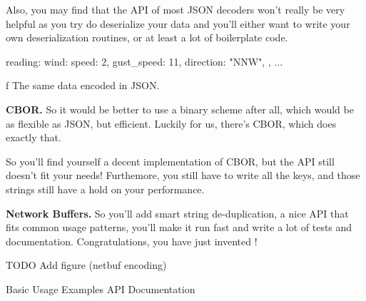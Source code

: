 Also, you may find that the API of most JSON decoders won't really be very
helpful as you try do deserialize your data and you'll either want to write your
own deserialization routines, or at least a lot of boilerplate code.

\bigskip
\begtt
reading: {
    wind: {
        speed: 2,
        gust_speed: 11,
        direction: "NNW",
    }, ...
}
\endtt
\caption/f The same data encoded in JSON.
\bigskip

\noindent
{\bf CBOR.} So it would be better to use a binary scheme after all,
which would be as flexible as JSON, but efficient. Luckily for us, there's
CBOR, which does exactly that.

So you'll find yourself a decent implementation of CBOR, but the API
still doesn't fit your needs! Furthemore, you still have to write all the keys,
and those strings still have a hold on your performance.


\noindent
{\bf Network Buffers.} So you'll add smart string de-duplication, a nice API
that fits common usage patterns, you'll make it run fast and write a lot of
tests and documentation. Congratulations, you have just invented \nb!

TODO Add figure (netbuf encoding)

\sec Basic Usage
\sec Examples
\sec API Documentation

\bye
